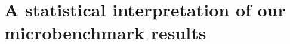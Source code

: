 \documentclass[conference]{IEEEtran}
\begin{document}

\label{sec:stats}
\section{A statistical interpretation of our microbenchmark results}
\end{document}
